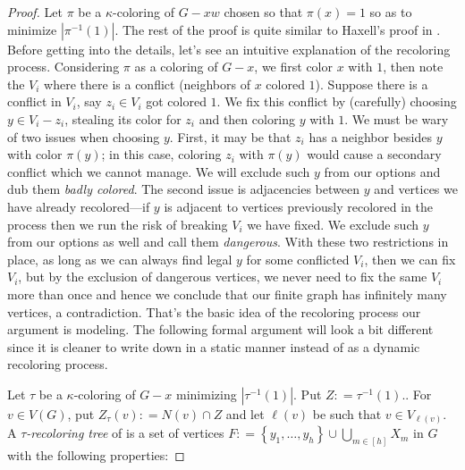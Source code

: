 \documentclass[12pt]{article}
\theoremstyle{plain}
\theoremstyle{definition}
\theoremstyle{remark}
\newcommand{\set}[1]{\left\{ #1 \right\}}
\newcommand{\card}[1]{\left|#1\right|}
\newcommand{\irange}[1]{\left[#1\right]}
\newcommand{\DefinedAs}{\mathrel{\mathop:}=}
\begin{document}
\begin{proof}
Let $\pi$ be a $\kappa$-coloring of $G-xw$ chosen so that $\pi(x) = 1$ so as to minimize $\card{\pi^{-1}(1)}$.  The rest of the proof is quite similar to Haxell's proof in \cite{haxell2004strong}.  Before getting into the details, let's see an intuitive explanation of the recoloring process. Considering $\pi$ as a coloring of $G-x$, we first color $x$ with $1$, then note the $V_i$ where there is a conflict (neighbors of $x$ colored $1$).  Suppose there is a conflict in $V_i$, say $z_i \in V_i$ got colored $1$.  We fix this conflict by (carefully) choosing $y \in V_i - z_i$, stealing its color for $z_i$ and then coloring $y$ with $1$.  We must be wary of two issues when choosing $y$.  First, it may be that $z_i$ has a neighbor besides $y$ with color $\pi(y)$; in this case, coloring $z_i$ with $\pi(y)$ would cause a secondary conflict which we cannot manage.  We will exclude such $y$ from our options and dub them \emph{badly colored}.  The second issue is adjacencies between $y$ and vertices we have already recolored---if $y$ is adjacent to vertices previously recolored in the process then we run the risk of breaking $V_i$ we have fixed.  We exclude such $y$ from our options as well and call them \emph{dangerous}.  With these two restrictions in place, as long as we can always find legal $y$ for some conflicted $V_i$, then we can fix $V_i$, but by the exclusion of dangerous vertices, we never need to fix the same $V_i$ more than once and hence we conclude that our finite graph has infinitely many vertices, a contradiction.  That's the basic idea of the recoloring process our argument is modeling.  The following formal argument will look a bit different since it is cleaner to write down in a static manner instead of as a dynamic recoloring process.

Let $\tau$ be a $\kappa$-coloring of $G-x$ minimizing $\card{\tau^{-1}(1)}$.  Put $Z \DefinedAs \tau^{-1}(1)$.. For $v \in V(G)$, put $Z_{\tau}(v) \DefinedAs N(v) \cap Z$ and let $\ell(v)$ be such that $v \in V_{\ell(v)}$. A \emph{$\tau$-recoloring tree} of is a set of vertices $F \DefinedAs \set{y_1, \ldots, y_h} \cup \bigcup_{m \in \irange{h}} X_m$ in $G$ with the following properties:


\end{proof}
\end{document}
